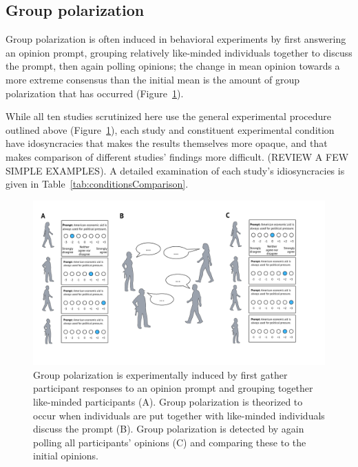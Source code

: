 \documentclass[11pt, letterpaper]{article}
\begin{document}
\subsection{Group polarization}

Group polarization is often induced in behavioral experiments by first answering
an opinion prompt, grouping
relatively like-minded individuals together to discuss the prompt, then 
again polling opinions; the change in mean opinion towards a more extreme
consensus than the initial mean is the amount of group polarization that has occurred
(Figure~\ref{fig:groupPolarizationSchematic}). 

While all ten studies scrutinized here use the general experimental procedure
outlined above (Figure~\ref{fig:groupPolarizationSchematic}), each study and constituent 
experimental condition have idosyncracies that makes the results themselves
more opaque, and that makes comparison of different studies' findings more
difficult. (REVIEW A FEW SIMPLE EXAMPLES). A detailed examination of each study's
idiosyncracies is given in Table~\ref{tab:conditionsComparison}.

\begin{figure}
  \caption{Group polarization is experimentally induced by first gather
  participant responses to an opinion prompt and grouping together like-minded
  participants (A). Group polarization is theorized to occur when individuals
  are put together with like-minded individuals discuss the prompt (B). Group 
  polarization is detected by again polling all participants' opinions (C) and comparing
  these to the initial opinions.}
  \label{fig:groupPolarizationSchematic}
  \centering
  \includegraphics[width=\textwidth]{Figures/GPExperimentSketch.pdf}
\end{figure}
\end{document}
